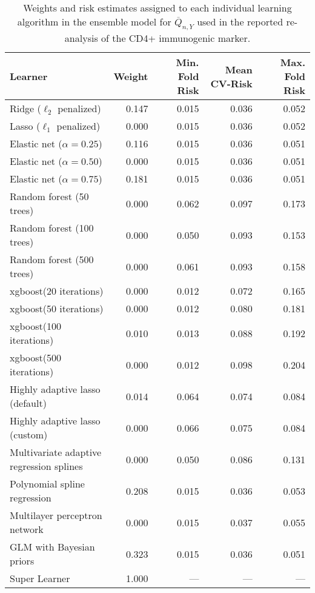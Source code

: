 \begin{table}[H]
\caption{\label{tab:cd4_sl_coefs} Weights and risk estimates assigned to each
  individual learning algorithm in the ensemble model for $\overline{Q}_{n,Y}$
  used in the reported re-analysis of the CD4+ immunogenic marker.}
\centering
\begin{tabular}[t]{l|r|r|r|r}
\hline
Learner & Weight & Min. Fold Risk & Mean CV-Risk & Max. Fold Risk\\
\hline
Ridge ($\ell_2$ penalized) & 0.147 & 0.015 & 0.036 & 0.052\\
\hline
Lasso ($\ell_1$ penalized) & 0.000 & 0.015 & 0.036 & 0.052\\
\hline
Elastic net ($\alpha = 0.25$) & 0.116 & 0.015 & 0.036 & 0.051\\
\hline
Elastic net ($\alpha = 0.50$) & 0.000 & 0.015 & 0.036 & 0.051\\
\hline
Elastic net ($\alpha = 0.75$) & 0.181 & 0.015 & 0.036 & 0.051\\
\hline
Random forest (50 trees) & 0.000 & 0.062 & 0.097 & 0.173\\
\hline
Random forest (100 trees) & 0.000 & 0.050 & 0.093 & 0.153\\
\hline
Random forest (500 trees) & 0.000 & 0.061 & 0.093 & 0.158\\
\hline
xgboost(20 iterations) & 0.000 & 0.012 & 0.072 & 0.165\\
\hline
xgboost(50 iterations) & 0.000 & 0.012 & 0.080 & 0.181\\
\hline
xgboost(100 iterations) & 0.010 & 0.013 & 0.088 & 0.192\\
\hline
xgboost(500 iterations) & 0.000 & 0.012 & 0.098 & 0.204\\
\hline
Highly adaptive lasso (default) & 0.014 & 0.064 & 0.074 & 0.084\\
\hline
Highly adaptive lasso (custom) & 0.000 & 0.066 & 0.075 & 0.084\\
\hline
Multivariate adaptive regression splines & 0.000 & 0.050 & 0.086 & 0.131\\
\hline
Polynomial spline regression & 0.208 & 0.015 & 0.036 & 0.053\\
\hline
Multilayer perceptron network & 0.000 & 0.015 & 0.037 & 0.055\\
\hline
GLM with Bayesian priors & 0.323 & 0.015 & 0.036 & 0.051\\
\hline
Super Learner & 1.000 & --- & --- & ---\\
\hline
\end{tabular}
\end{table}
